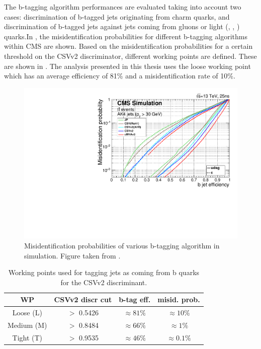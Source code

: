 The b-tagging algorithm performances are evaluated taking into account two cases: discrimination of b-tagged jets originating from charm quarks, and discrimination of b-tagged jets against jets coming from gluons or light (\Pup, \Pdown, \Pstrange) quarks.In , the misidentification probabilities for different b-tagging algorithms within CMS are shown.
Based on the misidentification probabilities for a certain threshold on the CSVv2 discriminator, different working points  are defined. These are shown in . The analysis presented in this thesis uses the loose working point which has an average efficiency of 81\% and a misidentification rate of 10\%. 
\begin{figure}[htbp]
	\centering
	\includegraphics[width=0.7\linewidth]{4_EventRecoSelect/Figures/Figure_008}
	\caption{Misidentification probabilities of various b-tagging algorithm in simulation. Figure taken from \cite{CMS-PAS-BTV-15-001}. }
	\label{fig:figure008}
\end{figure}
\begin{table}[htbp]
	\centering
	\caption{Working points used for tagging jets as coming from b quarks for the CSVv2 discriminant.}
	\begin{tabular}{cccc}
		\toprule
		WP  & CSVv2 discr cut & b-tag eff. & misid. prob. \\ 
		\midrule
		Loose (L) & $>$ 0.5426 & $\approx 81\%$ &  $\approx 10\%$ \\ 
	
		Medium (M)& $>$ 0.8484 & $\approx 66\%$ &  $\approx 1\%$\\ 
		
		Tight (T) & $>$ 0.9535 & $\approx 46\%$ &  $\approx 0.1\%$\\ 
		\bottomrule
	\end{tabular} 
	\label{tab:bctag}	
\end{table}

